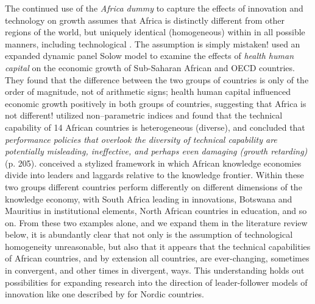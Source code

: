 \documentclass[11pt]{article}
\begin{document}
The continued use of the \emph{Africa dummy} to capture the effects of innovation and technology on growth assumes that Africa is distinctly different from other regions of the world, but uniquely identical (homogeneous) within in all possible manners, including technological \cite{Conway93}. The assumption is simply mistaken! \cite{Gyimah04} used an expanded dynamic panel Solow model to examine the effects of \emph{health human capital} on the economic growth of Sub-Saharan African and OECD countries. They found that the difference between the two groups of countries is only of the order of magnitude, not of arithmetic signs; health human capital influenced economic growth positively in both groups of countries, suggesting that Africa is not different! \cite{Amavilah06} utilized non--parametric indices and found that the technical capability of 14 African countries is heterogeneous (diverse), and concluded that \emph{performance policies that overlook the diversity of technical capability are potentially misleading, ineffective, and perhaps even damaging (growth retarding)} (p. 205). \cite{Asongu08} conceived a stylized framework in which African knowledge economies divide into leaders and laggards relative to the knowledge frontier. Within these two groups different countries perform differently on different dimensions of the knowledge economy, with South Africa leading in innovations, Botswana and Mauritius in institutional elements, North African countries in education, and so on. From these two examples alone, and we expand them in the literature review below, it is abundantly clear that not only is the assumption of technological homogeneity unreasonable, but also that it appears that the technical capabilities of African countries, and by extension all countries, are ever-changing, sometimes in convergent, and other times in divergent, ways.  This understanding holds out possibilities for expanding research into the direction of leader-follower models of innovation like one described by \cite{Stiglitz15} for Nordic countries.
\end{document}
